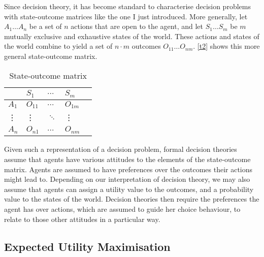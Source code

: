 Since  decision theory, it has become standard to characterise decision problems with state-outcome matrices like the one I just introduced. More generally, let $A_{1} \ldots A_{n}$ be a set of $n$ actions that are open to the agent, and let $S_{1} \ldots S_{m}$ be $m$ mutually exclusive and exhaustive states of the world. These actions and states of the world combine to yield a set of $n \cdot m$ outcomes $O_{11} \ldots O_{nm}$. \autoref{t2} shows this more general state-outcome matrix.

\begin{table}[h]
\centering
\begin{tabular}{lllll}
\hline
                             & $S_{1}$  & $\ldots$ & $S_{m}$  &   \\\hline\hline
\multicolumn{1}{l}{$A_{1}$}  &$ O_{11}$ & $\ldots$ & $O_{1m}$ &   \\
\multicolumn{1}{l}{\vdots}   & \vdots   & $\ddots$ & \vdots   &   \\
\multicolumn{1}{l}{$A_{n}$}  & $O_{n1}$ & $\ldots$ & $O_{nm}$ &   \\
\hline
\end{tabular}
\caption{State-outcome matrix}
\label{t2}
\end{table}

Given such a representation of a decision problem, formal decision theories assume that agents have various attitudes to the elements of the state-outcome matrix. Agents are assumed to have preferences over the outcomes their actions might lead to. Depending on our interpretation of decision theory, we may also assume that agents can assign a utility value to the outcomes, and a probability value to the states of the world. Decision theories then require the preferences the agent has over actions, which are assumed to guide her choice behaviour, to relate to those other attitudes in a particular way.

\subsection{Expected Utility Maximisation}\label{subs12}

